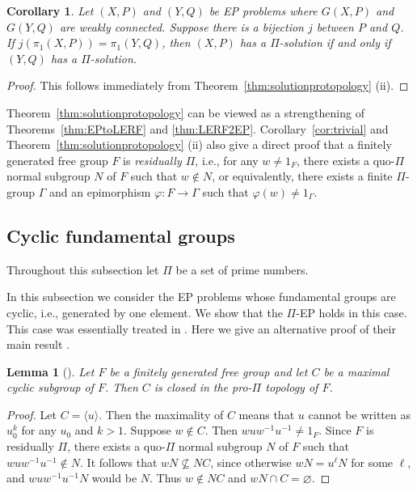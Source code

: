 \documentclass[10pt,a4paper]{amsart}
\newtheorem{corollary}[theorem]{Corollary}
\newtheorem{lemma}[theorem]{Lemma}
\theoremstyle{definition}
\theoremstyle{definition}
\numberwithin{equation}{section}
\begin{document}
\begin{corollary}\label{cor:fundgp} Let $(X, P)$ and $(Y, Q)$ be EP problems where $G(X, P)$ and $G(Y, Q)$ are weakly connected. Suppose there is a bijection $j$ between $P$ and $Q$. If $j(\pi_1(X, P))=\pi_1(Y, Q)$, then $(X, P)$ has a $\Pi$-solution if and only if $(Y, Q)$ has a $\Pi$-solution.
\end{corollary}

\begin{proof} This follows immediately from Theorem~\ref{thm:solutionprotopology} (ii).
\end{proof}

Theorem~\ref{thm:solutionprotopology} can be viewed as a strengthening of Theorems~\ref{thm:EPtoLERF} and \ref{thm:LERF2EP}.
Corollary~\ref{cor:trivial} and Theorem~\ref{thm:solutionprotopology} (ii) also give a direct proof that a finitely generated free group $F$ is {\em residually $\Pi$}, i.e., for any $w\neq 1_F$, there exists a quo-$\Pi$ normal subgroup $N$ of $F$ such that $w\not\in N$, or equivalently, there exists a finite $\Pi$-group $\Gamma$ and an epimorphism $\varphi\colon F\to \Gamma$ such that $\varphi(w)\neq 1_{\Gamma}$. 




\subsection{Cyclic fundamental groups} Throughout this subsection let $\Pi$ be a set of prime numbers.

In this subsection we consider the EP problems whose fundamental groups are cyclic, i.e., generated by one element. We show that the $\Pi$-EP holds in this case. This case was essentially treated in \cite{HPSW19}.
Here we give an alternative proof of their main result \cite[Theorem 1.5]{HPSW19}.

\begin{lemma} [{\cite[Lemma 9.1]{HPSW19}}]\label{lem:HPSW} Let $F$ be a finitely generated free group and let $C$ be a maximal cyclic subgroup of $F$. Then $C$ is closed in the pro-$\Pi$ topology of $F$. 
\end{lemma}

\begin{proof} Let $C=\langle u\rangle$. Then the maximality of $C$ means that $u$ cannot be written as $u_0^k$ for any $u_0$ and $k>1$. Suppose $w\not\in C$. Then $wuw^{-1}u^{-1}\neq 1_F$. Since $F$ is residually $\Pi$, there exists a quo-$\Pi$ normal subgroup $N$ of $F$ such that $wuw^{-1}u^{-1}\not\in N$. It follows that $wN\not\subseteq NC$, since otherwise $wN=u^\ell N$ for some $\ell$, and $wuw^{-1}u^{-1}N$ would be $N$. Thus $w\not\in NC$ and $wN\cap C=\varnothing$. 
\end{proof}
\end{document}

